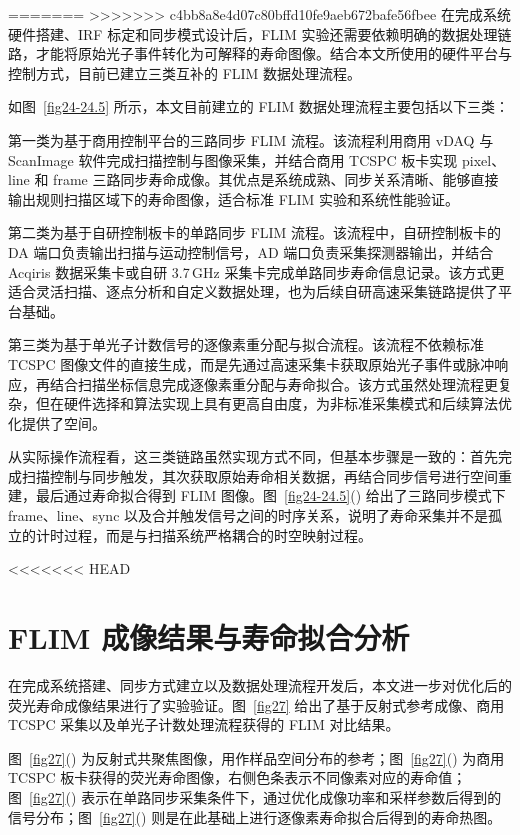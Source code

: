 =======
>>>>>>> c4bb8a8e4d07c80bffd10fe9aeb672bafe56fbee
在完成系统硬件搭建、IRF 标定和同步模式设计后，FLIM 实验还需要依赖明确的数据处理链路，才能将原始光子事件转化为可解释的寿命图像。结合本文所使用的硬件平台与控制方式，目前已建立三类互补的 FLIM 数据处理流程。

如图~\ref{fig24-24.5} 所示，本文目前建立的 FLIM 数据处理流程主要包括以下三类：

第一类为基于商用控制平台的三路同步 FLIM 流程。该流程利用商用 vDAQ 与 ScanImage 软件完成扫描控制与图像采集，并结合商用 TCSPC 板卡实现 pixel、line 和 frame 三路同步寿命成像。其优点是系统成熟、同步关系清晰、能够直接输出规则扫描区域下的寿命图像，适合标准 FLIM 实验和系统性能验证。

第二类为基于自研控制板卡的单路同步 FLIM 流程。该流程中，自研控制板卡的 DA 端口负责输出扫描与运动控制信号，AD 端口负责采集探测器输出，并结合 Acqiris 数据采集卡或自研 3.7\,GHz 采集卡完成单路同步寿命信息记录。该方式更适合灵活扫描、逐点分析和自定义数据处理，也为后续自研高速采集链路提供了平台基础。

第三类为基于单光子计数信号的逐像素重分配与拟合流程。该流程不依赖标准 TCSPC 图像文件的直接生成，而是先通过高速采集卡获取原始光子事件或脉冲响应，再结合扫描坐标信息完成逐像素重分配与寿命拟合。该方式虽然处理流程更复杂，但在硬件选择和算法实现上具有更高自由度，为非标准采集模式和后续算法优化提供了空间。

从实际操作流程看，这三类链路虽然实现方式不同，但基本步骤是一致的：首先完成扫描控制与同步触发，其次获取原始寿命相关数据，再结合同步信号进行空间重建，最后通过寿命拟合得到 FLIM 图像。图~\ref{fig24-24.5}() 给出了三路同步模式下 frame、line、sync 以及合并触发信号之间的时序关系，说明了寿命采集并不是孤立的计时过程，而是与扫描系统严格耦合的时空映射过程。

<<<<<<< HEAD

\section{FLIM 成像结果与寿命拟合分析}\label{5.5}

在完成系统搭建、同步方式建立以及数据处理流程开发后，本文进一步对优化后的荧光寿命成像结果进行了实验验证。图~\ref{fig27} 给出了基于反射式参考成像、商用 TCSPC 采集以及单光子计数处理流程获得的 FLIM 对比结果。

图~\ref{fig27}() 为反射式共聚焦图像，用作样品空间分布的参考；图~\ref{fig27}() 为商用 TCSPC 板卡获得的荧光寿命图像，右侧色条表示不同像素对应的寿命值；图~\ref{fig27}() 表示在单路同步采集条件下，通过优化成像功率和采样参数后得到的信号分布；图~\ref{fig27}() 则是在此基础上进行逐像素寿命拟合后得到的寿命热图。

